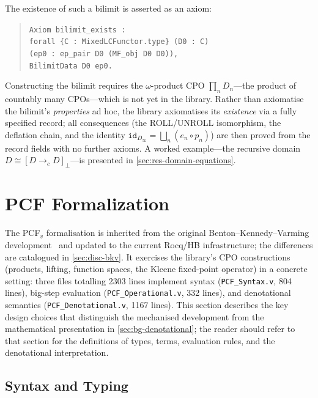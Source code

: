 The existence of such a bilimit is asserted as an axiom:
\begin{quote}
\texttt{Axiom bilimit\_exists :}\\
\quad\texttt{forall \{C : MixedLCFunctor.type\} (D0 : C)}\\
\quad\quad\texttt{(ep0 : ep\_pair D0 (MF\_obj D0 D0)),}\\
\quad\quad\texttt{BilimitData D0 ep0.}
\end{quote}
Constructing the bilimit requires the $\omega$-product CPO
$\prod_n D_n$---the product of countably many CPOs---which is not yet
in the library.  Rather than axiomatise the bilimit's
\emph{properties} ad hoc, the library axiomatises its
\emph{existence} via a fully specified record; all consequences (the
ROLL/UNROLL isomorphism, the deflation chain, and the identity
$\texttt{id}_{D_\infty} = \bigsqcup_n (e_n \circ p_n)$) are then proved
from the record fields with no further axioms.  A worked
example---the recursive domain $D \cong [D \to_c D]_\bot$---is
presented in \cref{sec:res-domain-equations}.

\section{PCF Formalization}
\label{sec:meth-pcf}

The PCF$_v$ formalisation is inherited from the original
Benton--Kennedy--Varming development~\cite{BKV2009} and updated to
the current Rocq/HB infrastructure; the differences are catalogued in
\cref{sec:disc-bkv}.  It exercises the library's CPO constructions
(products, lifting, function spaces, the Kleene fixed-point operator)
in a concrete setting: three files totalling 2303 lines implement
syntax (\texttt{PCF\_Syntax.v}, 804 lines), big-step evaluation
(\texttt{PCF\_Operational.v}, 332 lines), and denotational semantics
(\texttt{PCF\_Denotational.v}, 1167 lines).
This section describes the key design choices that distinguish the
mechanised development from the mathematical presentation in
\cref{sec:bg-denotational}; the reader should refer to that section
for the definitions of types, terms, evaluation rules, and the
denotational interpretation.

\subsection{Syntax and Typing}
\label{sec:meth-pcf-syntax}

